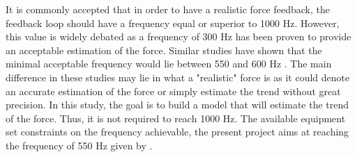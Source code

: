 It is commonly accepted that in order to have a realistic force feedback, the feedback loop should have a frequency equal or superior to 1000 Hz\cite{coles2011role}. However, this value is widely debated as a frequency of 300 Hz has been proven to provide an acceptable estimation of the force\cite{burdea1996force}. Similar studies have shown that the minimal acceptable frequency would lie between 550 and 600 Hz \cite{booth2003influence}. The main difference in these studies may lie in what a "realistic" force is as it could denote an accurate estimation of the force or simply estimate the trend without great precision. In this study, the goal is to build a model that will estimate the trend of the force. Thus, it is not required to reach 1000 Hz. The available equipment set constraints on the frequency achievable, the present project aims at reaching the frequency of 550 Hz given by \cite{booth2003influence}.







